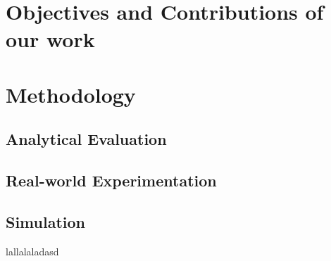 \documentclass[12pt]{article}
\begin{document}
\section{Objectives and Contributions of our work}

\section{Methodology}

\subsection{Analytical Evaluation}

\subsection{Real-world Experimentation}

\subsection{Simulation}
lallalaladasd
\end{document}
